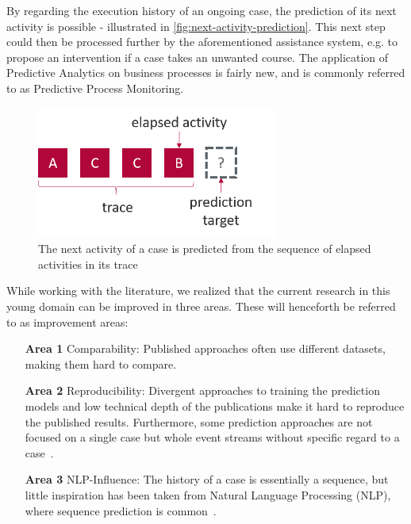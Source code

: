 By regarding the execution history of an ongoing case, the prediction of its next activity is possible - illustrated in \autoref{fig:next-activity-prediction}. This next step could then be processed further by the aforementioned assistance system, e.g. to propose an intervention if a case takes an unwanted course. The application of Predictive Analytics on business processes is fairly new, and is commonly referred to as Predictive Process Monitoring.

\begin{figure}
    \centering
    \includegraphics[width=0.7\textwidth]{gfx/next-activity.png}
    \caption[Next-activity prediction from a trace]{The next activity of a case is predicted from the sequence of elapsed activities in its trace}
    \label{fig:next-activity-prediction}
\end{figure}

While working with the literature, we realized that the current research in this young domain can be improved in three areas. These will henceforth be referred to as improvement areas:

\begin{enumerate}
    \item[\textbf{Area 1}] Comparability: Published approaches often use different datasets, making them hard to compare.
    \item[\textbf{Area 2}] Reproducibility: Divergent approaches to training the prediction models and low technical depth of the publications make it hard to reproduce the published results. Furthermore, some prediction approaches are not focused on a single case but whole event streams without specific regard to a case~\cite{evermann2016, schoenig2018}.
    \item[\textbf{Area 3}] NLP-Influence: The history of a case is essentially a sequence, but little inspiration has been taken from Natural Language Processing (NLP), where sequence prediction is common~\cite{shibata2016bipartite}.
\end{enumerate}

